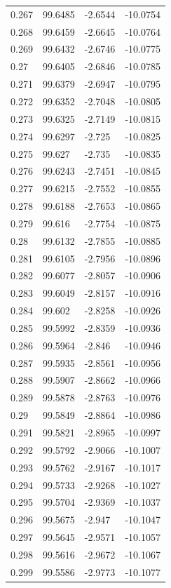 \begin{tabular}{llll}
0.267 & 99.6485 & -2.6544 & -10.0754 \\
0.268 & 99.6459 & -2.6645 & -10.0764 \\
0.269 & 99.6432 & -2.6746 & -10.0775 \\
0.27 & 99.6405 & -2.6846 & -10.0785 \\
0.271 & 99.6379 & -2.6947 & -10.0795 \\
0.272 & 99.6352 & -2.7048 & -10.0805 \\
0.273 & 99.6325 & -2.7149 & -10.0815 \\
0.274 & 99.6297 & -2.725 & -10.0825 \\
0.275 & 99.627 & -2.735 & -10.0835 \\
0.276 & 99.6243 & -2.7451 & -10.0845 \\
0.277 & 99.6215 & -2.7552 & -10.0855 \\
0.278 & 99.6188 & -2.7653 & -10.0865 \\
0.279 & 99.616 & -2.7754 & -10.0875 \\
0.28 & 99.6132 & -2.7855 & -10.0885 \\
0.281 & 99.6105 & -2.7956 & -10.0896 \\
0.282 & 99.6077 & -2.8057 & -10.0906 \\
0.283 & 99.6049 & -2.8157 & -10.0916 \\
0.284 & 99.602 & -2.8258 & -10.0926 \\
0.285 & 99.5992 & -2.8359 & -10.0936 \\
0.286 & 99.5964 & -2.846 & -10.0946 \\
0.287 & 99.5935 & -2.8561 & -10.0956 \\
0.288 & 99.5907 & -2.8662 & -10.0966 \\
0.289 & 99.5878 & -2.8763 & -10.0976 \\
0.29 & 99.5849 & -2.8864 & -10.0986 \\
0.291 & 99.5821 & -2.8965 & -10.0997 \\
0.292 & 99.5792 & -2.9066 & -10.1007 \\
0.293 & 99.5762 & -2.9167 & -10.1017 \\
0.294 & 99.5733 & -2.9268 & -10.1027 \\
0.295 & 99.5704 & -2.9369 & -10.1037 \\
0.296 & 99.5675 & -2.947 & -10.1047 \\
0.297 & 99.5645 & -2.9571 & -10.1057 \\
0.298 & 99.5616 & -2.9672 & -10.1067 \\
0.299 & 99.5586 & -2.9773 & -10.1077 \\

\end{tabular}
